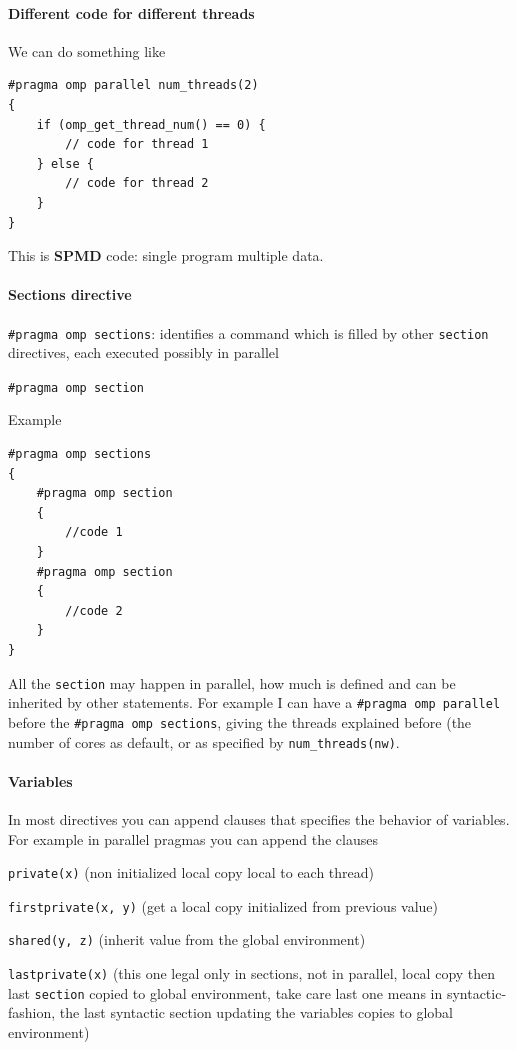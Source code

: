 \documentclass[10pt]{report}
\begin{document}
\paragraph{Different code for different threads} We can do something like
\begin{lstlisting}[style=myC]
#pragma omp parallel num_threads(2)
{
	if (omp_get_thread_num() == 0) {
		// code for thread 1
	} else {
		// code for thread 2
	}
}
\end{lstlisting}
This is \textbf{SPMD} code: single program multiple data.
\paragraph{Sections directive}
\begin{list}{}{}
	\item \texttt{\#pragma omp sections}: identifies a command which is filled by other \texttt{section} directives, each executed possibly in parallel
	\item \texttt{\#pragma omp section}
\end{list}
Example
\begin{lstlisting}[style=myC]
#pragma omp sections
{
	#pragma omp section
	{
		//code 1
	}
	#pragma omp section
	{
		//code 2
	}
}
\end{lstlisting}
All the \texttt{section} may happen in parallel, how much is defined and can be inherited by other statements. For example I can have a \texttt{\#pragma omp parallel} before the \texttt{\#pragma omp sections}, giving the threads explained before (the number of cores as default, or as specified by \texttt{num\_threads(nw)}.
\paragraph{Variables} In most directives you can append clauses that specifies the behavior of variables.\\
For example in parallel pragmas you can append the clauses\begin{list}{}{}
	\item\texttt{private(x)} (non initialized local copy local to each thread)
	\item\texttt{firstprivate(x, y)} (get a local copy initialized from previous value)
	\item\texttt{shared(y, z)} (inherit value from the global environment)
	\item\texttt{lastprivate(x)} (this one legal only in sections, not in parallel, local copy then last \texttt{section} copied to global environment, take care last one means in syntactic-fashion, the last syntactic section updating the variables copies to global environment)
\end{list}
\end{document}
